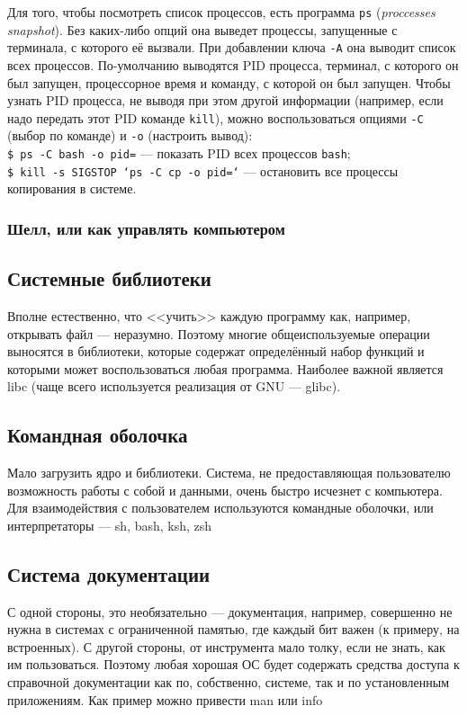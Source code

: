 Для того, чтобы посмотреть список процессов, есть программа \texttt{ps} (\emph{proccesses snapshot}). Без каких-либо опций она выведет процессы, запущенные с терминала, с которого её вызвали. При добавлении ключа \texttt{-A} она выводит список всех процессов. По-умолчанию выводятся PID процесса, терминал, с которого он был запущен, процессорное время и команду, с которой он был запущен.
Чтобы узнать PID процесса, не выводя при этом другой информации (например, если надо передать этот PID команде \texttt{kill}), можно воспользоваться опциями \texttt{-C} (выбор по команде) и \texttt{-o} (настроить вывод):\\
\texttt{\$ ps -C bash -o pid=} --- показать PID всех процессов \texttt{bash};\\
\texttt{\$ kill -s SIGSTOP `ps -C cp -o pid=`} --- остановить все процессы копирования в системе.

\subsubsection{Шелл, или как управлять компьютером}\label{base:os:structure:userutils:shell}

\subsection{Системные библиотеки}\label{base:os:structure:libs}
Вполне естественно, что <<учить>> каждую программу как, например, открывать файл --- неразумно. Поэтому многие общеиспользуемые операции выносятся в библиотеки, которые содержат определённый набор функций и которыми может воспользоваться любая программа. Наиболее важной является libc (чаще всего используется реализация от GNU --- glibc).

\subsection{Командная оболочка}\label{base:os:structure:shell}
Мало загрузить ядро и библиотеки. Система, не предоставляющая пользователю возможность работы с собой и данными, очень быстро исчезнет с компьютера. Для взаимодействия с пользователем используются командные оболочки, или интерпретаторы --- sh, bash, ksh, zsh

\subsection{Система документации}\label{base:os:structure:docs}
С одной стороны, это необязательно --- документация, например, совершенно не нужна в системах с ограниченной памятью, где каждый бит важен (к примеру, на встроенных). С другой стороны, от инструмента мало толку, если не знать, как им пользоваться. Поэтому любая хорошая ОС будет содержать средства доступа к справочной документации как по, собственно, системе, так и по установленным приложениям. Как пример можно привести man или info

